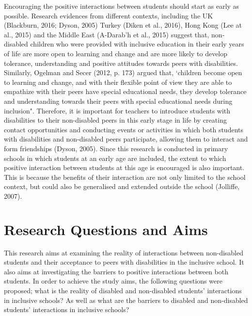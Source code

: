 \documentclass[11.5pt]{sig-alternate}
\begin{document}
\begin{large}
Encouraging the positive interactions between students should start as early as possible. Research evidences from different contexts, including the UK (Blackburn, 2016; Dyson, 2005) Turkey (Diken et al., 2016), Hong Kong (Lee at al., 2015) and the Middle East (A-Darab'h et al., 2015) suggest that, non-disabled children who were provided with inclusive education in their early years of life are more open to learning and change and are more likely to develop tolerance, understanding and positive attitudes towards peers with disabilities. Similarly, Ogelman and Secer (2012, p. 173) argued that, ‘children become open to learning and change, and with their flexible point of view they are able to empathize with their peers have special educational needs, they develop tolerance and understanding towards their peers with special educational needs during inclusion". Therefore, it is important for teachers to introduce students with disabilities to their non-disabled peers in this early stage in life by creating contact opportunities and conducting events or activities in which both students with disabilities and non-disabled peers participate, allowing them to interact and form friendships (Dyson, 2005). Since this research is conducted in primary schools in which students at an early age are included, the extent to which positive interaction between students at this age is encouraged is also important. This is because the benefits of their interaction are not only limited to the school context, but could also be generalised and extended outside the school (Jolliffe, 2007). 

\section*{Research Questions and Aims}
This research aims at examining the reality of interactions between non-disabled students and their acceptance to peers with disabilities in the inclusive school. It also aims at investigating the barriers to positive interactions between both students. In order to achieve the study aims, the following questions were proposed; what is the reality of disabled and non-disabled students’ interactions in inclusive schools? As well as what are the barriers to disabled and non-disabled students’ interactions in inclusive schools? 


\end{large}
\end{document}
